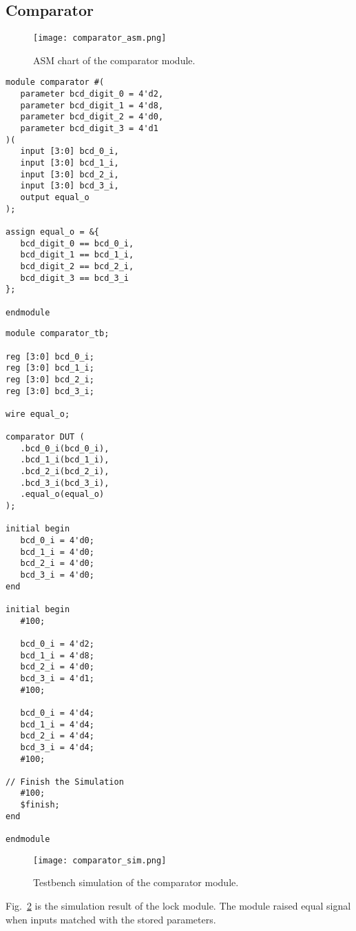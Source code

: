 \subsection{Comparator}

\begin{figure}[htbp]
   \centering
   \texttt{[image: comparator\_asm.png]}
   \caption{ASM chart of the comparator module.}
   \label{fig:comparator_asm}
\end{figure}

\begin{verbatim}
module comparator #(
   parameter bcd_digit_0 = 4'd2,
   parameter bcd_digit_1 = 4'd8,
   parameter bcd_digit_2 = 4'd0,
   parameter bcd_digit_3 = 4'd1
)(
   input [3:0] bcd_0_i,
   input [3:0] bcd_1_i,
   input [3:0] bcd_2_i,
   input [3:0] bcd_3_i,
   output equal_o
);

assign equal_o = &{
   bcd_digit_0 == bcd_0_i,
   bcd_digit_1 == bcd_1_i,
   bcd_digit_2 == bcd_2_i,
   bcd_digit_3 == bcd_3_i
};

endmodule
\end{verbatim}

\begin{verbatim}
module comparator_tb;

reg [3:0] bcd_0_i;
reg [3:0] bcd_1_i;
reg [3:0] bcd_2_i;
reg [3:0] bcd_3_i;

wire equal_o;

comparator DUT (
   .bcd_0_i(bcd_0_i),
   .bcd_1_i(bcd_1_i),
   .bcd_2_i(bcd_2_i),
   .bcd_3_i(bcd_3_i),
   .equal_o(equal_o)
);

initial begin
   bcd_0_i = 4'd0;
   bcd_1_i = 4'd0;
   bcd_2_i = 4'd0;
   bcd_3_i = 4'd0;
end

initial begin
   #100;

   bcd_0_i = 4'd2;
   bcd_1_i = 4'd8;
   bcd_2_i = 4'd0;
   bcd_3_i = 4'd1;
   #100;

   bcd_0_i = 4'd4;
   bcd_1_i = 4'd4;
   bcd_2_i = 4'd4;
   bcd_3_i = 4'd4;
   #100;

// Finish the Simulation
   #100;
   $finish;
end

endmodule
\end{verbatim}

\begin{figure}[htbp]
   \centerline{
   \texttt{[image: comparator\_sim.png]}}
   \caption{Testbench simulation of the comparator module.}
   \label{fig:comparator_sim}
\end{figure}

Fig.~\ref{fig:comparator_sim} is the simulation result of the lock module. The module raised equal signal when inputs matched with the stored parameters.
